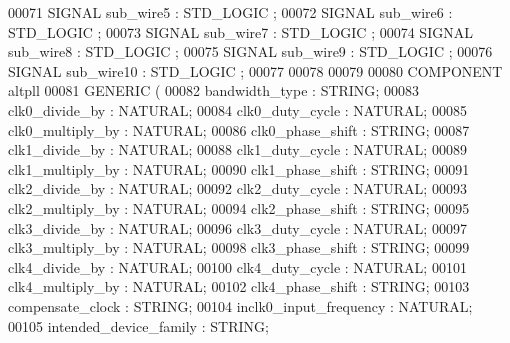 \begin{DoxyCode}
{00071     \textcolor{keywordflow}{SIGNAL} \textcolor{vhdlchar}{sub_wire5}    \textcolor{vhdlchar}{:} \textcolor{comment}{STD\_LOGIC} ;
00072     \textcolor{keywordflow}{SIGNAL} \textcolor{vhdlchar}{sub_wire6}    \textcolor{vhdlchar}{:} \textcolor{comment}{STD\_LOGIC} ;
00073     \textcolor{keywordflow}{SIGNAL} \textcolor{vhdlchar}{sub_wire7}    \textcolor{vhdlchar}{:} \textcolor{comment}{STD\_LOGIC} ;
00074     \textcolor{keywordflow}{SIGNAL} \textcolor{vhdlchar}{sub_wire8}    \textcolor{vhdlchar}{:} \textcolor{comment}{STD\_LOGIC} ;
00075     \textcolor{keywordflow}{SIGNAL} \textcolor{vhdlchar}{sub_wire9}    \textcolor{vhdlchar}{:} \textcolor{comment}{STD\_LOGIC} ;
00076     \textcolor{keywordflow}{SIGNAL} \textcolor{vhdlchar}{sub_wire10}   \textcolor{vhdlchar}{:} \textcolor{comment}{STD\_LOGIC} ;
00077 
00078 
00079 
00080     \textcolor{keywordflow}{COMPONENT} altpll
00081     \textcolor{keywordflow}{GENERIC} (
00082         bandwidth\_type      : \textcolor{comment}{STRING};
00083         clk0\_divide\_by      : \textcolor{comment}{NATURAL};
00084         clk0\_duty\_cycle     : \textcolor{comment}{NATURAL};
00085         clk0\_multiply\_by        : \textcolor{comment}{NATURAL};
00086         clk0\_phase\_shift        : \textcolor{comment}{STRING};
00087         clk1\_divide\_by      : \textcolor{comment}{NATURAL};
00088         clk1\_duty\_cycle     : \textcolor{comment}{NATURAL};
00089         clk1\_multiply\_by        : \textcolor{comment}{NATURAL};
00090         clk1\_phase\_shift        : \textcolor{comment}{STRING};
00091         clk2\_divide\_by      : \textcolor{comment}{NATURAL};
00092         clk2\_duty\_cycle     : \textcolor{comment}{NATURAL};
00093         clk2\_multiply\_by        : \textcolor{comment}{NATURAL};
00094         clk2\_phase\_shift        : \textcolor{comment}{STRING};
00095         clk3\_divide\_by      : \textcolor{comment}{NATURAL};
00096         clk3\_duty\_cycle     : \textcolor{comment}{NATURAL};
00097         clk3\_multiply\_by        : \textcolor{comment}{NATURAL};
00098         clk3\_phase\_shift        : \textcolor{comment}{STRING};
00099         clk4\_divide\_by      : \textcolor{comment}{NATURAL};
00100         clk4\_duty\_cycle     : \textcolor{comment}{NATURAL};
00101         clk4\_multiply\_by        : \textcolor{comment}{NATURAL};
00102         clk4\_phase\_shift        : \textcolor{comment}{STRING};
00103         compensate\_clock        : \textcolor{comment}{STRING};
00104         inclk0\_input\_frequency      : \textcolor{comment}{NATURAL};
00105         intended\_device\_family      : \textcolor{comment}{STRING};
}
\end{DoxyCode}
